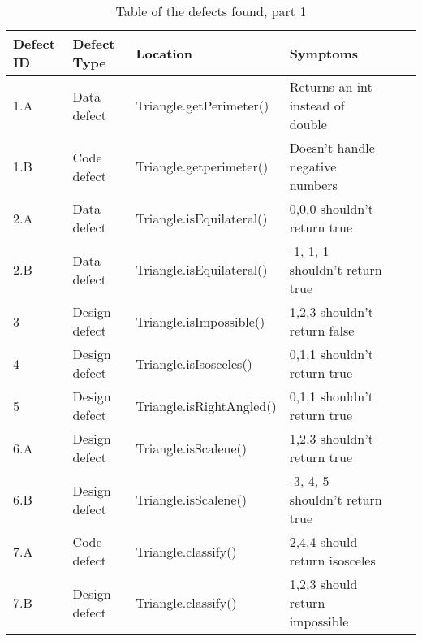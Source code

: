 \begin{table}[!htb]
\caption{Table of the defects found, part 1}
\begin{tabular}{|l|l|l|l|l|l|}
\hline  Defect ID & Defect Type   & Location  & Symptoms\\ \hline
1.A       & Data defect   & Triangle.getPerimeter()  & Returns an int instead of double \\
1.B       & Code defect   & Triangle.getperimeter()  & Doesn't handle negative numbers  \\
2.A       & Data defect   & Triangle.isEquilateral() & 0,0,0 shouldn't return true      \\
2.B       & Data defect   & Triangle.isEquilateral() & -1,-1,-1 shouldn't return true   \\
3         & Design defect & Triangle.isImpossible()  & 1,2,3 shouldn't return false     \\
4         & Design defect & Triangle.isIsosceles()   & 0,1,1 shouldn't return true      \\
5         & Design defect & Triangle.isRightAngled() & 0,1,1 shouldn't return true      \\
6.A       & Design defect & Triangle.isScalene()     & 1,2,3 shouldn't return true      \\
6.B       & Design defect & Triangle.isScalene()     & -3,-4,-5 shouldn't return true   \\
7.A       & Code defect   & Triangle.classify()      & 2,4,4 should return isosceles    \\
7.B       & Design defect & Triangle.classify()      & 1,2,3 should return impossible   \\         \hline     
\end{tabular}
\end{table}

